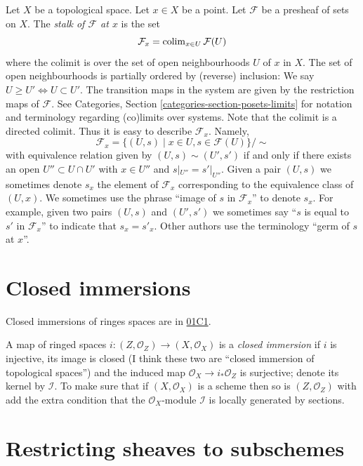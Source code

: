 \medskip\noindent
Let $X$ be a topological space. Let $x \in X$ be a point.
Let $\mathcal{F}$ be a presheaf of sets on $X$.
The {\it stalk of $\mathcal{F}$ at $x$} is the set
$$
\mathcal{F}_x
=
\mathop{\mathrm{colim}}\nolimits_{x\in U} \mathcal{F}(U)
$$
where the colimit is over the set of open neighbourhoods
$U$ of $x$ in $X$. The set of open neighbourhoods is
partially ordered by (reverse) inclusion:
We say $U \geq U' \Leftrightarrow U \subset U'$.
The transition maps in the system are
given by the restriction maps of $\mathcal{F}$.
See Categories, Section \ref{categories-section-posets-limits}
for notation and terminology regarding (co)limits over systems.
Note that the colimit is a directed colimit.
Thus it is easy to describe $\mathcal{F}_x$. Namely,
$$
\mathcal{F}_x
=
\{
(U, s)
\mid
x\in U, s\in \mathcal{F}(U)
\}/\sim
$$
with equivalence relation given by $(U, s) \sim (U', s')$ if and only if
there exists an open $U'' \subset U \cap U'$ with $x \in U''$ and
$s|_{U''} = s'|_{U''}$. Given a pair $(U, s)$ we sometimes denote
$s_x$ the element of $\mathcal{F}_x$ corresponding to the equivalence
class of $(U, x)$. We sometimes use the phrase
``image of $s$ in $\mathcal{F}_x$'' to denote $s_x$.
For example, given two pairs $(U, s)$ and $(U', s')$ we sometimes
say ``$s$ is equal to $s'$ in $\mathcal{F}_x$'' to indicate
that $s_x = s'_x$. Other authors use the terminology
``germ of $s$ at $x$''.

\section{Closed immersions}
\label{section-closed-immersion}

\noindent
Closed immersions of ringes spaces are in 
\href{https://stacks.math.columbia.edu/tag/01C1}{01C1}.

\begin{definition}
\label{definition-closed-immersion}
A map of ringed spaces
$i:(Z,\mathcal{O}_Z) \to (X,\mathcal{O}_X)$ 
is a {\it closed immersion}
if $i$ is injective,
its image is closed (I think these two are 
``closed immersion of topological spaces'')
and the induced map $\mathcal{O}_X \to i_*\mathcal{O}_Z$
is surjective; denote its kernel by $\mathcal{I}$.
To make sure that if $(X,\mathcal{O}_X)$ is a scheme
then so is $(Z,\mathcal{O}_Z)$ with add the extra condition
that the $\mathcal{O}_X$-module $\mathcal{I}$ is
locally generated by sections.
\end{definition}

\section{Restricting sheaves to subschemes}
\label{section-restriction}

